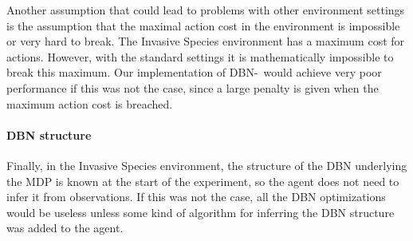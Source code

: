 Another assumption that could lead to problems with other environment settings is the assumption that the maximal action cost in the environment is impossible or very hard to break. The Invasive Species environment has a maximum cost for actions. However, with the standard settings it is mathematically impossible to break this maximum. Our implementation of DBN-\etre\ would achieve very poor performance if this was not the case, since a large penalty is given when the maximum action cost is breached. 

\paragraph{DBN structure} Finally, in the Invasive Species environment, the structure of the DBN underlying the MDP is known at the start of the experiment, so the agent does not need to infer it from observations. If this was not the case, all the DBN optimizations would be useless unless some kind of algorithm for inferring the DBN structure was added to the agent. 
